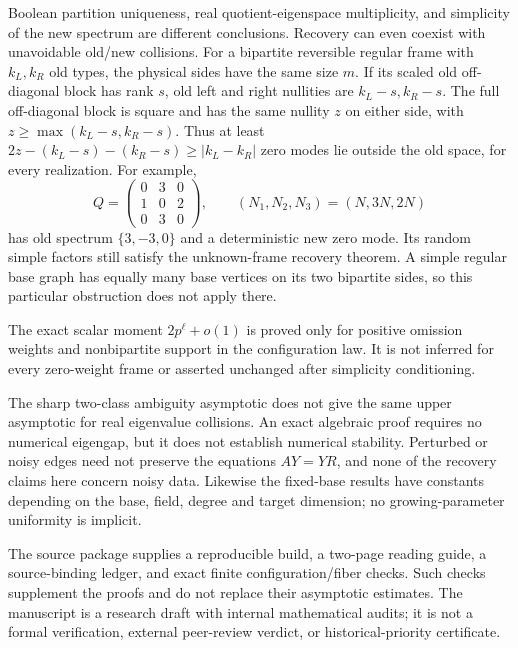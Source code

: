 Boolean partition uniqueness, real quotient-eigenspace multiplicity,
and simplicity of the new spectrum are different conclusions.
Recovery can even coexist with unavoidable old/new collisions.
For a bipartite reversible regular frame with $k_L,k_R$ old types,
the physical sides have the same size $m$. If its scaled old
off-diagonal block has rank $s$, old left and right nullities are
$k_L-s,k_R-s$. The full off-diagonal block is square and has the
same nullity $z$ on either side, with
$z\ge\max(k_L-s,k_R-s)$. Thus at least
$2z-(k_L-s)-(k_R-s)\ge|k_L-k_R|$ zero modes lie outside the old
space, for every realization. For example,
\[
 Q=\begin{pmatrix}0&3&0\\1&0&2\\0&3&0\end{pmatrix},\qquad
 (N_1,N_2,N_3)=(N,3N,2N)
\]
has old spectrum $\{3,-3,0\}$ and a deterministic new zero mode.
Its random simple factors still satisfy the unknown-frame recovery
theorem. A simple regular base graph has equally many base vertices
on its two bipartite sides, so this particular obstruction does not
apply there.

The exact scalar moment $2p^\ell+o(1)$ is proved only for positive
omission weights and nonbipartite support in the configuration law.
It is not inferred for every zero-weight frame or asserted unchanged
after simplicity conditioning.

The sharp two-class ambiguity asymptotic does not give the same upper
asymptotic for real eigenvalue collisions. An exact algebraic proof
requires no numerical eigengap, but it does not establish numerical
stability. Perturbed or noisy edges need not preserve the equations
$AY=YR$, and none of the recovery claims here concern noisy data.
Likewise the fixed-base results have constants depending on the base,
field, degree and target dimension; no growing-parameter uniformity is
implicit.

The source package supplies a reproducible build, a two-page reading
guide, a source-binding ledger, and exact finite configuration/fiber
checks. Such checks supplement the proofs and do not replace their
asymptotic estimates. The manuscript is a research draft with internal
mathematical audits; it is not a formal verification, external
peer-review verdict, or historical-priority certificate.

